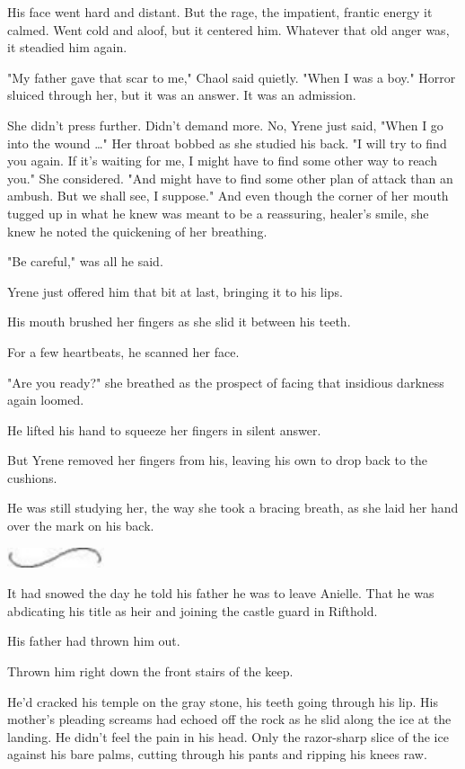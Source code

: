 His face went hard and distant. But the rage, the impatient, frantic energy  it calmed. Went cold and aloof, but it centered him. Whatever that old anger was, it steadied him again.

"My father gave that scar to me," Chaol said quietly. "When I was a boy." Horror sluiced through her, but it was an answer. It was an admission.

She didn't press further. Didn't demand more. No, Yrene just said, "When I go into the wound \ldots" Her throat bobbed as she studied his back. "I will try to find you again. If it's waiting for me, I might have to find some other way to reach you." She considered. "And might have to find some other plan of attack than an ambush. But we shall see, I suppose." And even though the corner of her mouth tugged up in what he knew was meant to be a reassuring, healer's smile, she knew he noted the quickening of her breathing.

"Be careful," was all he said.

Yrene just offered him that bit at last, bringing it to his lips.

His mouth brushed her fingers as she slid it between his teeth.

For a few heartbeats, he scanned her face.

"Are you ready?" she breathed as the prospect of facing that insidious darkness again loomed.

He lifted his hand to squeeze her fingers in silent answer.

But Yrene removed her fingers from his, leaving his own to drop back to the cushions.

He was still studying her, the way she took a bracing breath, as she laid her hand over the mark on his back.

\includegraphics[width=1.12in,height=0.24in]{images/seperator}

It had snowed the day he told his father he was to leave Anielle. That he was abdicating his title as heir and joining the castle guard in Rifthold.

His father had thrown him out.

Thrown him right down the front stairs of the keep.

He'd cracked his temple on the gray stone, his teeth going through his lip. His mother's pleading screams had echoed off the rock as he slid along the ice at the landing. He didn't feel the pain in his head. Only the razor-sharp slice of the ice against his bare palms, cutting through his pants and ripping his knees raw.

